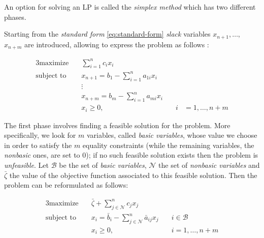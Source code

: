 An option for solving an \acrshort{LP} is called the \emph{simplex
	method} which has two different phases.

Starting from the \emph{standard form} \eqref{eq:standard-form}
\emph{slack} variables $x_{n+1}, \dots, $ $x_{n+m} $ are introduced, allowing to express the problem as follows
\cite{Vanderbei2008,Edgar2001}:

\begin{alignat}{3}
	\label{eq:standard-form}
	\text{maximize}   \quad & \sum_{i=1}^{n} c_{i}x_{i}                                                                   \\
	\text{subject to} \quad & x_{n+1}                   = b_{1} - \sum_{i=1}^{n} a_{1i}  x_{i} &                          \\
	                        & \vdots                                                                                      \\
	                        & x_{n+m}                   = b_{m} - \sum_{i=1}^{n} a_{mi}  x_{i} &                          \\
	                        & x_{i}                     \geq 0,                                & \quad i & =1 ,\dots, n+m
\end{alignat}

The first phase involves finding a feasible solution for the problem. More
specifically, we look for $m$ variables, called \emph{basic variables}, whose
value we choose in order to satisfy the $m$ equality constraints (while the
remaining variables, the \emph{nonbasic} ones, are set to 0); if no such
feasible solution exists then the problem is \emph{unfeasible}. Let $\mathcal{B}
$ be the set of \emph{basic variables}, $\mathcal{N} $ the set of
\emph{nonbasic variables} \cite{Vanderbei2008,Bertsimas1997} and
$\bar{\zeta}$ the value of the objective function associated to this feasible
solution. Then the
problem can be reformulated as follows:

\begin{alignat}{3}
	\label{eq:standard-form-simplex-new}
	\text{maximize} \quad     & \bar{\zeta} + \sum_{j \in \mathcal{N} }^{n} c_{j}x_{j}                                           \\
	\text{subject to}   \quad & x_{i} = \bar{b}_{i} - \sum_{j \in \mathcal{N} }^{n} \bar{a}_{ij} x_{j} & \quad i \in \mathcal{B} \\
	                          & x_{i} \geq 0,                                                          & \quad i =1 ,\dots, n+m
\end{alignat}

